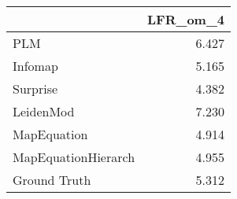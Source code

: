 \begin{tabular}{lr}
\toprule
{} & LFR_om_4 \\
\midrule
PLM                 &    6.427 \\
Infomap             &    5.165 \\
Surprise            &    4.382 \\
LeidenMod           &    7.230 \\
MapEquation         &    4.914 \\
MapEquationHierarch &    4.955 \\
Ground Truth        &    5.312 \\
\bottomrule
\end{tabular}
